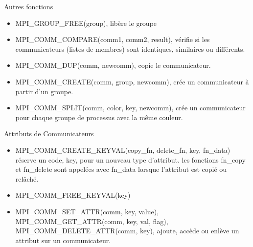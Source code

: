 \documentclass[10pt]{beamer}
\begin{document}
\begin{frame}{Autres fonctions}

  \begin{itemize}
    \item MPI\_GROUP\_FREE(group), libère le groupe

    \item MPI\_COMM\_COMPARE(comm1, comm2, result), vérifie si les communicateurs (listes de membres) sont identiques, similaires ou différents.

    \item MPI\_COMM\_DUP(comm, newcomm), copie le communicateur.

    \item MPI\_COMM\_CREATE(comm, group, newcomm), crée un communicateur à partir d'un groupe.

    \item MPI\_COMM\_SPLIT(comm, color, key, newcomm), crée un communicateur pour chaque groupe de processus avec la même couleur.
  \end{itemize}
\end{frame}

\begin{frame}{Attributs de Communicateurs}

  \begin{itemize}
    \item MPI\_COMM\_CREATE\_KEYVAL(copy\_fn, delete\_fn, key, fn\_data) réserve un code, key, pour un nouveau type d'attribut. les fonctions fn\_copy et fn\_delete sont appelées avec fn\_data lorsque l'attribut est copié ou relâché.

    \item MPI\_COMM\_FREE\_KEYVAL(key)

    \item MPI\_COMM\_SET\_ATTR(comm, key, value), MPI\_COMM\_GET\_ATTR(comm, key, val, flag), MPI\_COMM\_DELETE\_ATTR(comm, key), ajoute, accède ou enlève un attribut sur un communicateur.
  \end{itemize}
\end{frame}
\end{document}
